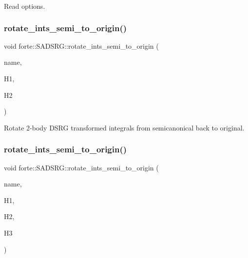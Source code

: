 Read options. 

\mbox{\label{classforte_1_1_s_a_d_s_r_g_ae66cb0e5c905a50ff70b69fbb3ff81fc}} 
\subsubsection{\texorpdfstring{rotate\+\_\+ints\+\_\+semi\+\_\+to\+\_\+origin()}{rotate\_ints\_semi\_to\_origin()}\hspace{0.1cm}{\footnotesize\ttfamily [1/2]}}
{\footnotesize\ttfamily void forte\+::\+S\+A\+D\+S\+R\+G\+::rotate\+\_\+ints\+\_\+semi\+\_\+to\+\_\+origin (\begin{DoxyParamCaption}\item[{const std\+::string \&}]{name,  }\item[{Blocked\+Tensor \&}]{H1,  }\item[{Blocked\+Tensor \&}]{H2 }\end{DoxyParamCaption})\hspace{0.3cm}{\ttfamily [protected]}}



Rotate 2-\/body D\+S\+RG transformed integrals from semicanonical back to original. 

\mbox{\label{classforte_1_1_s_a_d_s_r_g_ac0394785b738ca0ac43c5a040b591c71}} 
\subsubsection{\texorpdfstring{rotate\+\_\+ints\+\_\+semi\+\_\+to\+\_\+origin()}{rotate\_ints\_semi\_to\_origin()}\hspace{0.1cm}{\footnotesize\ttfamily [2/2]}}
{\footnotesize\ttfamily void forte\+::\+S\+A\+D\+S\+R\+G\+::rotate\+\_\+ints\+\_\+semi\+\_\+to\+\_\+origin (\begin{DoxyParamCaption}\item[{const std\+::string \&}]{name,  }\item[{Blocked\+Tensor \&}]{H1,  }\item[{Blocked\+Tensor \&}]{H2,  }\item[{Blocked\+Tensor \&}]{H3 }\end{DoxyParamCaption})\hspace{0.3cm}{\ttfamily [protected]}}




